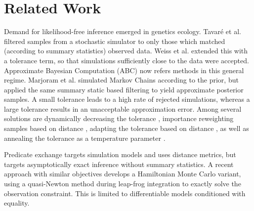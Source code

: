 \section{Related Work}

Demand for likelihood-free inference emerged in genetics ecology.
Tavar{\'e} et al.  
filtered samples from a stochastic simulator to only those which matched (according to summary statistics) observed data. 
Weiss et al.  extended this with a tolerance term, so that simulations sufficiently close to the data were accepted.
Approximate Bayesian Computation (ABC) now refers methods \cite{beaumont2002approximate,sisson2007sequential} in this general regime.
Marjoram et al.  simulated Markov Chains according to the prior, but applied the same summary static based filtering to yield approximate posterior samples.
A small tolerance leads to a high rate of rejected simulations, whereas a large tolerance results in an unacceptable approximation error.
Among several solutions are dynamically decreasing the tolerance \cite{toni2008approximate}, importance reweighting samples based on distance \cite{wegmann2009efficient}, adapting the tolerance based on distance \cite{del2012adaptive,lenormand2013adaptive}, as well as annealing the tolerance as a temperature parameter \cite{albert2015simulated}.

Predicate exchange targets simulation models and uses distance metrics, but targets asymptotically exact inference without summary statistics.
A recent approach \cite{graham2017asymptotically}  with similar objectives develops a Hamiltonian Monte Carlo variant, using a quasi-Newton method during leap-frog integration to exactly solve the observation constraint.
This is limited to differentiable models conditioned with equality.


